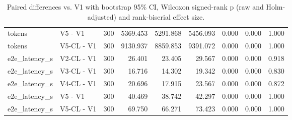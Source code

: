\begin{table}[t]
\begin{tabular}{llrrrrrrr}
tokens & V5 - V1 & 300 & 5369.453 & 5291.868 & 5456.093 & 0.000 & 0.000 & 1.000 \\
tokens & V5-CL - V1 & 300 & 9130.937 & 8859.853 & 9391.072 & 0.000 & 0.000 & 1.000 \\
e2e\_latency\_s & V2-CL - V1 & 300 & 26.401 & 23.405 & 29.567 & 0.000 & 0.000 & 0.918 \\
e2e\_latency\_s & V3-CL - V1 & 300 & 16.716 & 14.302 & 19.342 & 0.000 & 0.000 & 0.830 \\
e2e\_latency\_s & V4-CL - V1 & 300 & 20.696 & 17.915 & 23.567 & 0.000 & 0.000 & 0.872 \\
e2e\_latency\_s & V5 - V1 & 300 & 40.469 & 38.742 & 42.297 & 0.000 & 0.000 & 1.000 \\
e2e\_latency\_s & V5-CL - V1 & 300 & 69.750 & 66.271 & 73.423 & 0.000 & 0.000 & 1.000 \\
\bottomrule
\end{tabular}
\caption{Paired differences vs. V1 with bootstrap 95\% CI, Wilcoxon signed-rank p (raw and Holm-adjusted) and rank-biserial effect size.}
\label{tab:rigor_paired_tests}
\end{table}
